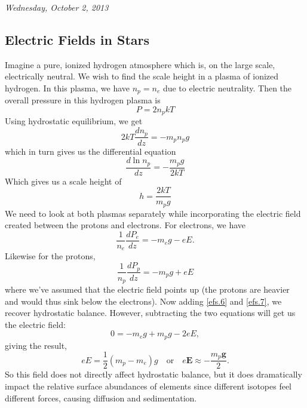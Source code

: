 \documentclass[10pt]{article}
\numberwithin{equation}{section}
\newcommand{\n}{\noindent}
\begin{document}
	\n \textit{Wednesday, October 2, 2013}
	\subsection{Electric Fields in Stars}
	Imagine a pure, ionized hydrogen atmosphere which is, on the large 
scale, electrically neutral. We wish to find the scale height in a plasma 
of ionized hydrogen. In this plasma, we have $n_p=n_e$ due to electric 
neutrality. Then the overall pressure in this hydrogen plasma is
	\begin{equation}
		\label{efs.2} P=2n_pkT
	\end{equation}
	Using hydrostatic equilibrium, we get
	\begin{equation}
		\label{efs.3} 2kT\frac{dn_p}{dz}=-m_pn_pg
	\end{equation}
	which in turn gives us the differential equation
	\begin{equation}
		\label{efs.4} \frac{d\ln n_p}{dz}=-\frac{m_pg}{2kT}
	\end{equation}
	Which gives us a scale height of
	\begin{equation}
		\label{efs.5} h=\frac{2kT}{m_pg}
	\end{equation}
	We need to look at both plasmas separately while incorporating the 
electric field created between the protons and electrons. For electrons, we 
have
	\begin{equation}
		\label{efs.6} \frac{1}{n_e}\frac{dP_e}{dz}=-m_eg-eE.
	\end{equation}
	Likewise for the protons,
	\begin{equation}
		\label{efs.7} \frac{1}{n_p}\frac{dP_p}{dz}=-m_pg+eE
	\end{equation}
	where we've assumed that the electric field points up (the protons are 
heavier and would thus sink below the electrons). Now adding \eqref{efs.6} 
and \eqref{efs.7}, we recover hydrostatic balance. However, subtracting the 
two equations will get us the electric field:
	\begin{equation}
		\label{efs.8} 0=-m_eg+m_pg-2eE,
	\end{equation}
	giving the result,
	\begin{equation}
		\label{efs.9} eE=\frac{1}{2}\left(m_p-m_e\right)g \quad \textrm{or}
\quad e\mathbf{E}\approx -\frac{m_p\mathbf{g}}{2}.
	\end{equation}
	So this field does not directly affect hydrostatic balance, but it does 
dramatically impact the relative surface abundances of elements since different isotopes feel different forces, causing diffusion and sedimentation.
\end{document}
